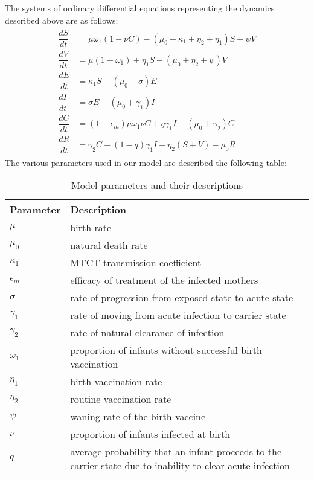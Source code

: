 The systems of ordinary differential equations representing the dynamics described above are as follows:
\begin{align}
\begin{split}
\dfrac{dS}{dt}&=\mu\omega_1(1-\nu C)-(\mu_0+\kappa_1+\eta_2+\eta_1)S+\psi V\\
\dfrac{dV}{dt}&=\mu(1-\omega_1)+\eta_1S-(\mu_0+\eta_2+\psi)V \\
\dfrac{dE}{dt}&=\kappa_1S-(\mu_0+\sigma)E \label{eqn: 1}\\
\dfrac{dI}{dt}&=\sigma E-(\mu_0+\gamma_1)I\\
\dfrac{dC}{dt}&=(1-\epsilon_m)\mu\omega_1\nu C+q\gamma_1I-(\mu_0+\gamma_2)C\\
\dfrac{dR}{dt}&=\gamma_2C+(1-q)\gamma_1I+\eta_2(S+V)-\mu_0R
\end{split}
\end{align}
The various parameters used in our model are described the following table:

\vspace{1cm}
\begin{table}[t]
	\centering
	\begin{tabular}{ |p{1.57cm}|p{12cm}| }
		\hline
		Parameter& Description \\
		\hline
		$	\mu		$    					& 				birth rate    \\
		$	\mu_0 $					     &  	 natural death rate   \\
		$\kappa_1$ 				      & 	MTCT transmission coefficient\\
		$\epsilon_m$ 			   & 	efficacy of treatment of the infected mothers\\
		$\sigma$ 						 & 	rate of progression from exposed state to acute state\\
		$\gamma_1$				   & 	rate of moving from acute infection to carrier state\\
		$\gamma_2$ 				   & 	rate of natural clearance of infection\\
		$\omega_1$					& 	proportion of infants without successful birth vaccination\\
		$\eta_1$ 						 & 	birth vaccination rate\\
		$\eta_2$ 						 &	 routine vaccination rate\\
		$\psi$								 &	 waning rate of the birth vaccine\\
		$\nu$ 								 & 	proportion of infants infected at birth\\
		$q$ 								   & 	average probability that an infant proceeds to the carrier state due to inability to clear acute infection\\
		\hline
	\end{tabular}
	\caption{Model parameters and their descriptions}
	\label{table:1}
\end{table}
